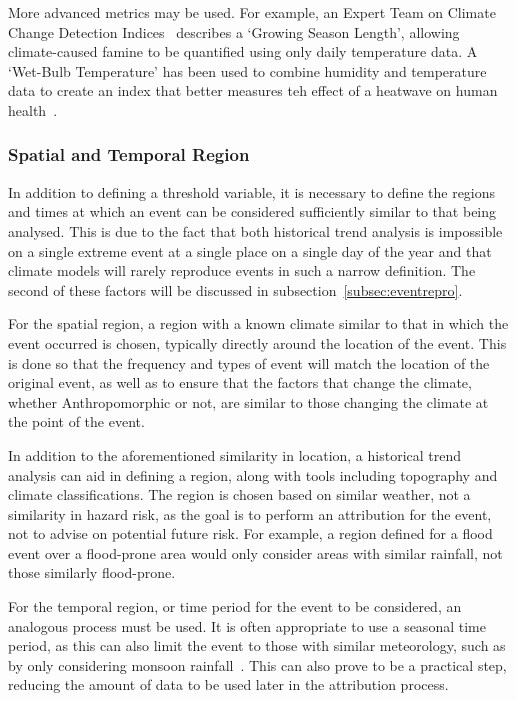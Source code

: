 \documentclass[12pt,a4paper]{report}
\begin{document}
More advanced metrics may be used.
For example, an Expert Team on Climate Change Detection Indices~\cite{Zhang_2011}
    describes a `Growing Season Length',
    allowing climate-caused famine to be quantified using only daily temperature data.
A `Wet-Bulb Temperature' has been used to combine humidity and temperature data to create an index that better measures teh effect of a heatwave on human health~\cite{Li_2020}.

\subsubsection{Spatial and Temporal Region}

In addition to defining a threshold variable,
    it is necessary to define the regions and times at which an event can be considered sufficiently similar to that being analysed.
This is due to the fact that both historical trend analysis is impossible on a single extreme event at a single place on a single day of the year
    and that climate models will rarely reproduce events in such a narrow definition.
The second of these factors will be discussed in subsection~\ref{subsec:eventrepro}.

For the spatial region,
    a region with a known climate similar to that in which the event occurred is chosen,
    typically directly around the location of the event.
This is done so that the frequency and types of event will match the location of the original event,
    as well as to ensure that the factors that change the climate,
    whether Anthropomorphic or not,
    are similar to those changing the climate at the point of the event.

In addition to the aforementioned similarity in location,
    a historical trend analysis can aid in defining a region,
    along with tools including topography and climate classifications.
The region is chosen based on similar weather,
    not a similarity in hazard risk,
    as the goal is to perform an attribution for the event,
    not to advise on potential future risk.
For example,
    a region defined for a flood event over a flood-prone area would only consider areas with similar rainfall,
    not those similarly flood-prone.

For the temporal region,
    or time period for the event to be considered,
    an analogous process must be used.
It is often appropriate to use a seasonal time period,
    as this can also limit the event to those with similar meteorology,
    such as by only considering monsoon rainfall~\cite{Otto_et_al_2023}.
This can also prove to be a practical step,
    reducing the amount of data to be used later in the attribution process.
\end{document}
